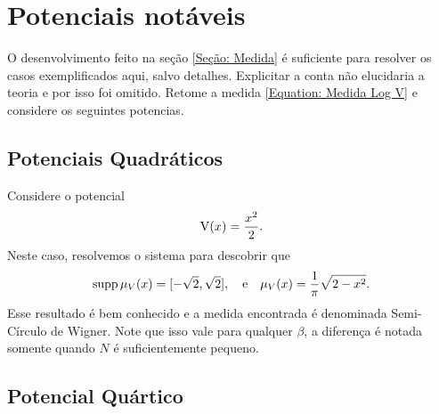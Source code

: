 \section{Potenciais notáveis}
\label{Section: Potencias}

 O desenvolvimento feito na seção \ref{Seção: Medida} é suficiente para resolver os casos exemplificados aqui, salvo detalhes. Explicitar a conta não elucidaria a teoria e por isso foi omitido. Retome a medida \ref{Equation: Medida Log V} e considere os seguintes potencias.





\subsection{Potenciais Quadráticos}
Considere o potencial $$\operatorname{V}(x) = \frac{x^2}{2}.$$ Neste caso, resolvemos o sistema para descobrir que
\begin{equation}
	 \operatorname{supp}{\mu_V(x)} = [-\sqrt{2}, \sqrt{2}], \ \ \ \text{e} \ \ \ \mu_V(x) = \frac{1}{\pi} \sqrt{2 - x^2}.
	 \label{Equação: Quadrático}
\end{equation}
Esse resultado é bem conhecido e a medida encontrada é denominada Semi-Círculo de Wigner. Note que isso vale para qualquer $\beta$, a diferença é notada somente quando $N$ é suficientemente pequeno.

\subsection{Potencial Quártico}

